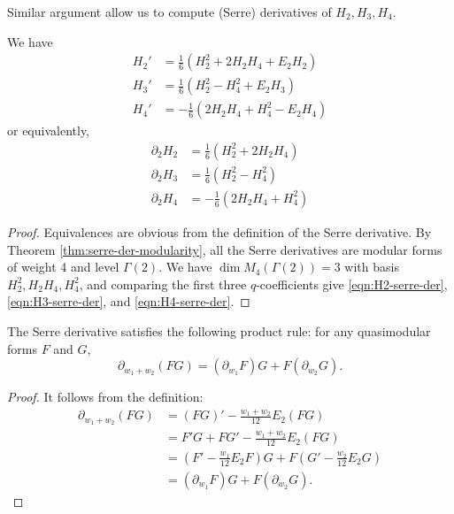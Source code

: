 Similar argument allow us to compute (Serre) derivatives of $H_2, H_3, H_4$.
\begin{proposition}\label{prop:theta-der}
We have
\begin{align}
    H_2' &= \frac{1}{6} (H_{2}^{2} + 2 H_{2} H_{4} + E_2 H_2) \label{eqn:H2-der}\\
    H_3' &= \frac{1}{6} (H_{2}^{2} - H_{4}^{2} + E_2 H_3) \label{eqn:H3-der}\\
    H_4' &= -\frac{1}{6} (2H_{2} H_{4} + H_{4}^{2} - E_2 H_4) \label{eqn:H4-der}
\end{align}
or equivalently,
\begin{align}
    \partial_{2} H_{2} &= \frac{1}{6} (H_{2}^{2} + 2 H_{2} H_{4}) \label{eqn:H2-serre-der} \\
    \partial_{2} H_{3} &= \frac{1}{6} (H_{2}^{2} - H_{4}^{2}) \label{eqn:H3-serre-der} \\
    \partial_{2} H_{4} &= -\frac{1}{6} (2H_{2} H_{4} + H_{4}^{2}) \label{eqn:H4-serre-der}
\end{align}
\end{proposition}
\begin{proof}
Equivalences are obvious from the definition of the Serre derivative.
By Theorem \ref{thm:serre-der-modularity}, all the Serre derivatives are modular forms of weight 4 and level $\Gamma(2)$.
We have $\dim M_4(\Gamma(2)) = 3$ with basis $H_2^2, H_2 H_4, H_4^2$, and comparing the first three $q$-coefficients give \eqref{eqn:H2-serre-der}, \eqref{eqn:H3-serre-der}, and \eqref{eqn:H4-serre-der}.
\end{proof}

\begin{theorem}\label{thm:serre-der-prod-rule}
The Serre derivative satisfies the following product rule: for any quasimodular forms $F$ and $G$,
\begin{equation}
    \partial_{w_1 + w_2} (FG) = (\partial_{w_1}F)G + F (\partial_{w_2}G).
\end{equation}
\end{theorem}
\begin{proof}
It follows from the definition:
\begin{align}
    \partial_{w_1 + w_2} (FG) &= (FG)' - \frac{w_1 + w_2}{12} E_2 (FG) \\
    &= F'G + FG' - \frac{w_1 + w_2}{12} E_2(FG) \\
    &= \left(F' - \frac{w_1}{12}E_2 F\right)G + F \left(G' - \frac{w_2}{12}E_2 G\right) \\
    &= (\partial_{w_1}F)G + F(\partial_{w_2}G).
\end{align}
\end{proof}

